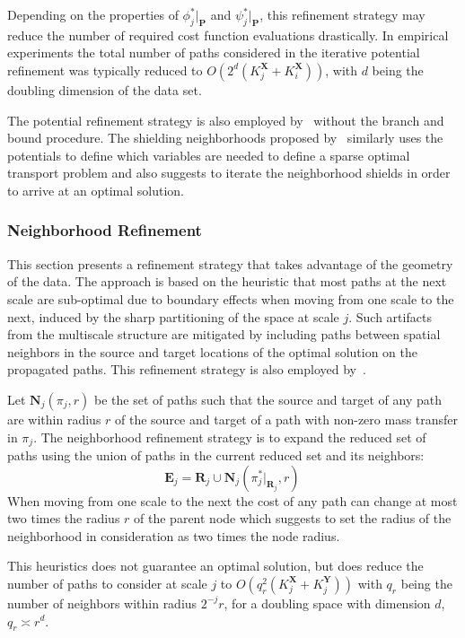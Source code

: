 \documentclass[twoside,11pt]{article}
\newcommand{\coupling}[0]{\pi}
\newcommand{\Xsp}{{\mathbf{X}}}
\newcommand{\Ysp}{{\mathbf{Y}}}
\begin{document}
Depending on the properties of $ \phi_j^* |_\mathbf{P}$ and $\psi_j^*
|_\mathbf{P}$, this refinement strategy may reduce the number of required cost
function evaluations drastically. In empirical experiments the total number of
paths considered in the iterative potential refinement was typically reduced to
$O( 2^d ( K_j^\Xsp + K_i^\Xsp) )$, with $d$ being the doubling dimension of the
data set. 

The potential refinement strategy is also employed by~\citet{glimm:arxiv2011}
without the branch and bound procedure. The shielding neighborhoods proposed
by~\citet{schmitzer2015sparse} similarly uses the potentials to define which
variables are needed to define a sparse optimal transport problem and also
suggests to iterate the neighborhood shields in order to arrive at an optimal
solution.




\subsubsection{Neighborhood Refinement}
\label{sec:neighborhood}
This section presents  a refinement strategy that takes advantage of the
geometry of the data. The approach is based on the heuristic that most paths at
the next scale are sub-optimal due to boundary effects when moving from one
scale to the next, induced by the sharp partitioning of the space at scale $j$.
Such artifacts from the multiscale structure are mitigated by including paths
between spatial neighbors in the source and target locations of the optimal
solution on the propagated paths. This refinement strategy is also employed
by~\citet{oberman2015efficient}.



Let $\mathbf{N}_j\left(\coupling_j, r\right)$ be the set of paths such that the
source and target of any path are within radius $r$ of the source and target of
a path with non-zero mass transfer in $\coupling_j$.  The neighborhood
refinement strategy is to expand the reduced set of paths using the union of
paths in the current reduced set and its neighbors:
$$
\mathbf{E}_j = \mathbf{R}_j \cup \mathbf{N}_j \left( \coupling_j^*|_{\mathbf{R}_j}, r\right) \,
$$  
When moving from one scale to the next the cost of any path can change at most
two times the radius $r$ of the parent node which suggests to set the radius of
the neighborhood in consideration as two times the node radius. 

This heuristics does not guarantee an optimal solution, but does reduce the
number of paths to consider at scale $j$ to $O( q_r^2 (K_j^{{\Xsp}} +
K_j^{{\Ysp}}))$ with $q_r$ being the number of neighbors within radius
$2^{-j}r$, for a doubling space with dimension $d$, $q_r\asymp r^d$.
\end{document}
